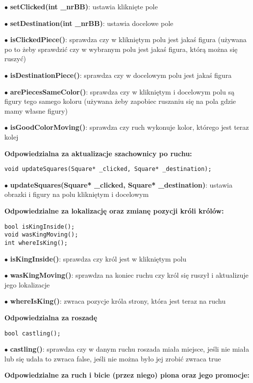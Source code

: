 \documentclass[]{report}
\begin{document}
\begin{flushleft}
$\bullet$ \textbf{setClicked(int \_nrBB)}: ustawia kliknięte pole


$\bullet$ \textbf{setDestination(int \_nrBB)}: ustawia docelowe pole

$\bullet$ \textbf{isClickedPiece()}: sprawdza czy w klikniętym polu jest jakaś figura (używana po to żeby sprawdzić czy w wybranym polu jest jakaś figura, którą można się ruszyć)

$\bullet$ \textbf{isDestinationPiece()}: sprawdza czy w docelowym polu jest jakaś figura

$\bullet$ \textbf{arePiecesSameColor()}: sprawdza czy w klikniętym i docelowym polu są figury tego samego koloru (używana żeby zapobiec ruszaniu się na pola gdzie mamy własne figury)

$\bullet$ \textbf{isGoodColorMoving()}: sprawdza czy ruch wykonuje kolor, którego jest teraz kolej

 \textbf{Odpowiedzialna za aktualizacje szachownicy po ruchu:}

\begin{lstlisting}
void updateSquares(Square* _clicked, Square* _destination);
\end{lstlisting}
$\bullet$ \textbf{updateSquares(Square* \_clicked, Square* \_destination)}: ustawia obrazki i figury na polu klikniętym i docelowym

 \textbf{Odpowiedzialne za lokalizację oraz zmianę pozycji króli królów:}

\begin{lstlisting}
bool isKingInside();
void wasKingMoving();
int whereIsKing();
\end{lstlisting}
$\bullet$ \textbf{isKingInside()}: sprawdza czy król jest w klikniętym polu

$\bullet$ \textbf{wasKingMoving()}: sprawdza na koniec ruchu czy król się ruszył i aktualizuje jego lokalizacje

$\bullet$ \textbf{whereIsKing()}: zwraca pozycje króla strony, która jest teraz na ruchu

\textbf{Odpowiedzialna za roszadę}

\begin{lstlisting}
bool castling();
\end{lstlisting}
$\bullet$ \textbf{castling()}: sprawdza czy w danym ruchu roszada miała miejsce, jeśli nie miała lub się udała to zwraca false, jeśli nie można było jej zrobić zwraca true

\textbf{Odpowiedzialne za ruch i bicie (przez niego) piona oraz jego promocje:}


\end{flushleft}
\end{document}
